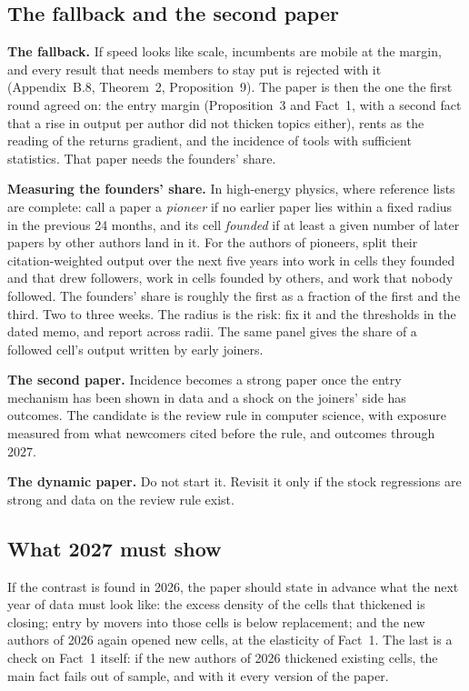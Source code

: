 \subsection{The fallback and the second paper}

\textbf{The fallback.} If speed looks like scale, incumbents are mobile at the margin, and every result that needs members to stay put is rejected with it (Appendix~B.8, Theorem~2, Proposition~9). The paper is then the one the first round agreed on: the entry margin (Proposition~3 and Fact~1, with a second fact that a rise in output per author did not thicken topics either), rents as the reading of the returns gradient, and the incidence of tools with sufficient statistics. That paper needs the founders' share.

\textbf{Measuring the founders' share.} In high-energy physics, where reference lists are complete: call a paper a \emph{pioneer} if no earlier paper lies within a fixed radius in the previous 24 months, and its cell \emph{founded} if at least a given number of later papers by other authors land in it. For the authors of pioneers, split their citation-weighted output over the next five years into work in cells they founded and that drew followers, work in cells founded by others, and work that nobody followed. The founders' share is roughly the first as a fraction of the first and the third. Two to three weeks. The radius is the risk: fix it and the thresholds in the dated memo, and report across radii. The same panel gives the share of a followed cell's output written by early joiners.

\textbf{The second paper.} Incidence becomes a strong paper once the entry mechanism has been shown in data and a shock on the joiners' side has outcomes. The candidate is the review rule in computer science, with exposure measured from what newcomers cited before the rule, and outcomes through 2027.

\textbf{The dynamic paper.} Do not start it. Revisit it only if the stock regressions are strong and data on the review rule exist.

\subsection{What 2027 must show}

If the contrast is found in 2026, the paper should state in advance what the next year of data must look like:
the excess density of the cells that thickened is closing;
entry by movers into those cells is below replacement;
and the new authors of 2026 again opened new cells, at the elasticity of Fact~1. The last is a check on Fact~1 itself: if the new authors of 2026 thickened existing cells, the main fact fails out of sample, and with it every version of the paper.
